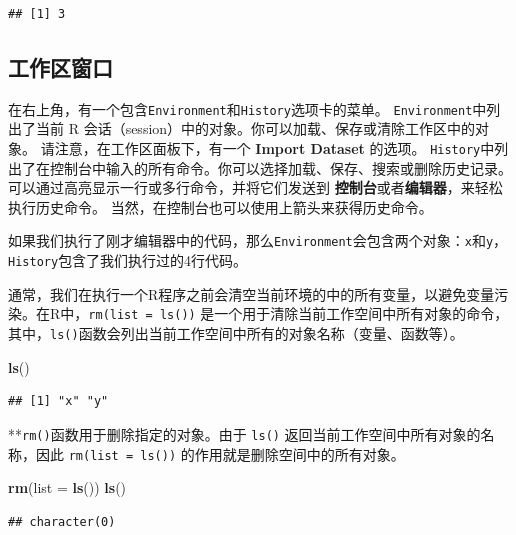 \documentclass[
]{book}
\newenvironment{Shaded}{\begin{snugshade}}{\end{snugshade}}
\newcommand{\AttributeTok}[1]{\textcolor[rgb]{0.13,0.29,0.53}{#1}}
\newcommand{\FunctionTok}[1]{\textcolor[rgb]{0.13,0.29,0.53}{\textbf{#1}}}
\newcommand{\NormalTok}[1]{#1}
\begin{document}
\begin{verbatim}
## [1] 3
\end{verbatim}

\subsection{工作区窗口}\label{ux5de5ux4f5cux533aux7a97ux53e3}

在右上角，有一个包含\texttt{Environment}和\texttt{History}选项卡的菜单。
\texttt{Environment}中列出了当前 R 会话（session）中的对象。你可以加载、保存或清除工作区中的对象。
请注意，在工作区面板下，有一个 \textbf{Import Dataset} 的选项。
\texttt{History}中列出了在控制台中输入的所有命令。你可以选择加载、保存、搜索或删除历史记录。 可以通过高亮显示一行或多行命令，并将它们发送到 \textbf{控制台}或者\textbf{编辑器}，来轻松执行历史命令。
当然，在控制台也可以使用上箭头来获得历史命令。

如果我们执行了刚才编辑器中的代码，那么\texttt{Environment}会包含两个对象：\texttt{x}和\texttt{y}，\texttt{History}包含了我们执行过的4行代码。

通常，我们在执行一个R程序之前会清空当前环境的中的所有变量，以避免变量污染。在R中，\texttt{rm(list\ =\ ls())} 是一个用于清除当前工作空间中所有对象的命令，其中，\texttt{ls()}函数会列出当前工作空间中所有的对象名称（变量、函数等）。

\begin{Shaded}
\begin{Highlighting}[]
\FunctionTok{ls}\NormalTok{()}
\end{Highlighting}
\end{Shaded}

\begin{verbatim}
## [1] "x" "y"
\end{verbatim}

**\texttt{rm()}函数用于删除指定的对象。由于 \texttt{ls()} 返回当前工作空间中所有对象的名称，因此 \texttt{rm(list\ =\ ls())} 的作用就是删除空间中的所有对象。

\begin{Shaded}
\begin{Highlighting}[]
\FunctionTok{rm}\NormalTok{(}\AttributeTok{list =} \FunctionTok{ls}\NormalTok{())}
\FunctionTok{ls}\NormalTok{()}
\end{Highlighting}
\end{Shaded}

\begin{verbatim}
## character(0)
\end{verbatim}
\end{document}
